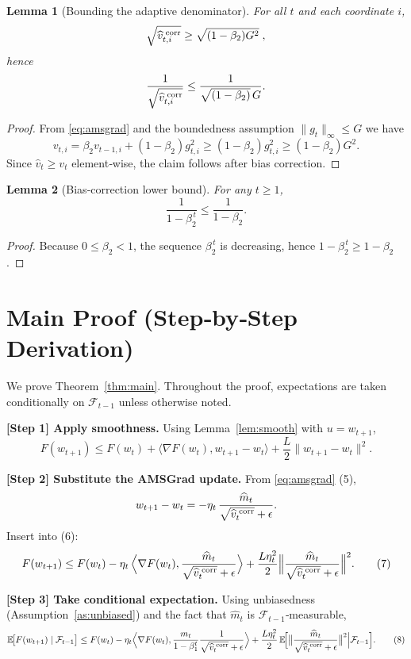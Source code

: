 \documentclass{article}
\newtheorem{lemma}{Lemma}
\begin{document}
\begin{lemma}[Bounding the adaptive denominator]\label{lem:denom}
For all $t$ and each coordinate $i$,
\[
\sqrt{\widehat v_{t,i}^{\;{\rm corr}}} \ge \sqrt{(1-\beta_2)G^2}\;,
\]
hence
\[
\frac{1}{\sqrt{\widehat v_{t,i}^{\;{\rm corr}}}} \le \frac{1}{\sqrt{(1-\beta_2)}\,G}.
\]
\end{lemma}
\begin{proof}
From \eqref{eq:amsgrad} and the boundedness assumption $\|g_t\|_\infty\le G$ we have
\[
v_{t,i} = \beta_2 v_{t-1,i} + (1-\beta_2)g_{t,i}^2 \ge (1-\beta_2)g_{t,i}^2\ge (1-\beta_2)G^2.
\]
Since $\widehat v_t\ge v_t$ element‑wise, the claim follows after bias correction. \qedhere
\end{proof}

\begin{lemma}[Bias‑correction lower bound]\label{lem:bias}
For any $t\ge 1$,
\[
\frac{1}{1-\beta_2^{\,t}} \le \frac{1}{1-\beta_2}.
\]
\end{lemma}
\begin{proof}
Because $0\le\beta_2<1$, the sequence $\beta_2^{\,t}$ is decreasing, hence $1-\beta_2^{\,t}\ge 1-\beta_2$. \qedhere
\end{proof}

\section*{Main Proof (Step‑by‑Step Derivation)}
We prove Theorem~\ref{thm:main}.  Throughout the proof, expectations are taken conditionally on $\mathcal{F}_{t-1}$ unless otherwise noted.

\bigskip
\noindent\textbf{[Step 1] Apply smoothness.}
Using Lemma~\ref{lem:smooth} with $u=w_{t+1}$,
\[
F(w_{t+1}) \le F(w_t) + \big\langle\nabla F(w_t), w_{t+1}-w_t\big\rangle
               + \frac{L}{2}\|w_{t+1}-w_t\|^2 . \tag{6}
\]

\noindent\textbf{[Step 2] Substitute the AMSGrad update.}
From \eqref{eq:amsgrad} (5),
\[
w_{t+1}-w_t = -\eta_t\,\frac{\widehat m_t}{\sqrt{\widehat v_t^{\;{\rm corr}}}+\epsilon}.
\]
Insert into (6):
\[
F(w_{t+1}) \le F(w_t) -\eta_t\,
\Big\langle\nabla F(w_t),\frac{\widehat m_t}{\sqrt{\widehat v_t^{\;{\rm corr}}}+\epsilon}\Big\rangle
+ \frac{L\eta_t^{2}}{2}\Big\|\frac{\widehat m_t}{\sqrt{\widehat v_t^{\;{\rm corr}}}+\epsilon}\Big\|^{2}. \tag{7}
\]

\noindent\textbf{[Step 3] Take conditional expectation.}
Using unbiasedness (Assumption~\ref{as:unbiased}) and the fact that $\widehat m_t$ is $\mathcal{F}_{t-1}$‑measurable,
\[
\mathbb{E}\!\bigl[F(w_{t+1})\mid\mathcal{F}_{t-1}\bigr]
\le F(w_t) -\eta_t
\Big\langle\nabla F(w_t),\frac{m_t}{1-\beta_1^{t}}\frac{1}{\sqrt{\widehat v_t^{\;{\rm corr}}}+\epsilon}\Big\rangle
+ \frac{L\eta_t^{2}}{2}\,\mathbb{E}\!\Bigl[\big\|\frac{\widehat m_t}{\sqrt{\widehat v_t^{\;{\rm corr}}}+\epsilon}\big\|^{2}\Big|\mathcal{F}_{t-1}\Bigr]. \tag{8}
\]
\end{document}
